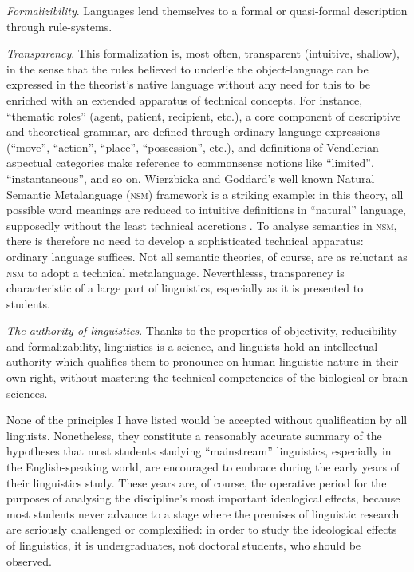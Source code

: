 \documentclass[output=paper]{langscibook}
\begin{document}
\emph{Formalizibility}. Languages lend themselves to a formal or quasi-formal description through rule-systems.

\emph{Transparency}. This formalization is, most often, transparent (intuitive, shallow), in the sense that the rules believed to underlie the object-language can be expressed in the theorist's native language without any need for this to be enriched with an extended apparatus of technical concepts. For instance, ``thematic roles'' (agent, patient, recipient, etc.), a core component of descriptive and theoretical grammar, are defined through ordinary language expressions (``move'', ``action'', ``place'', ``possession'', etc.), and definitions of Vendlerian aspectual categories make reference to commonsense notions like ``limited'', ``instantaneous'', and so on. Wierzbicka and Goddard's well known Natural Semantic Metalanguage (\textsc{nsm}) framework is a striking example: in this theory, all possible word meanings are reduced to intuitive definitions in ``natural'' language, supposedly without the least technical accretions \citep[see][]{Wierzbicka1996}. To analyse semantics in \textsc{nsm}, there is therefore no need to develop a sophisticated technical apparatus: ordinary language suffices. Not all semantic theories, of course, are as reluctant as \textsc{nsm} to adopt a technical metalanguage. Neverthlesss, transparency is characteristic of a large part of linguistics, especially as it is presented to students.

\emph{The authority of linguistics}. Thanks to the properties of objectivity, reducibility and formalizability, linguistics is a science, and linguists hold an intellectual authority which qualifies them to pronounce on human linguistic nature in their own right, without mastering the technical competencies of the biological or brain sciences.

None of the principles I have listed would be accepted without qualification by all linguists. Nonetheless, they constitute a reasonably accurate summary of the hypotheses that most students studying ``mainstream'' linguistics, especially in the English-speaking world, are encouraged to embrace during the early years of their linguistics study. These years are, of course, the operative period for the purposes of analysing the discipline's most important ideological effects, because most students never advance to a stage where the premises of linguistic research are seriously challenged or complexified: in order to study the ideological effects of linguistics, it is undergraduates, not doctoral students, who should be observed.
\end{document}

